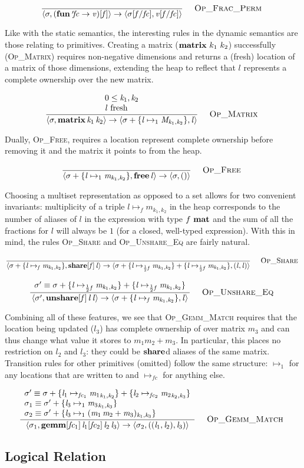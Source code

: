 \vspace{-\baselineskip}
\[
    \ottdruleOpXXFracXXPerm{}
\]

Like with the static semantics, the interesting rules in the dynamic semantics
are those relating to primitives. Creating a matrix ($\ottkw{matrix}\ k_1\
k_2$) successfully (\textsc{Op\_Matrix}) requires non-negative dimensions and
returns a (fresh) location of a matrix of those dimensions, extending the heap
to reflect that $l$ represents a complete ownership over the new matrix.

\vspace{-\baselineskip}
\[
    \ottdruleOpXXMatrix{}
\]

Dually, \textsc{Op\_Free}, requires a location represent complete ownership
before removing it and the matrix it points to from the heap.

\vspace{-\baselineskip}
\[
    \ottdruleOpXXFree{}
\]

Choosing a multiset representation as opposed to a set allows for two
convenient invariants: multiplicity of a triple $l \mapsto_f m_{k_1, k_2}$ in
the heap corresponds to the number of aliases of $l$ in the expression with
type $f\ \ottkw{mat}$ and the sum of all the fractions for $l$ will always be
$1$ (for a closed, well-typed expression). With this in mind, the rules
\textsc{Op\_Share} and \textsc{Op\_Unshare\_Eq} are fairly natural.

\vspace{-\baselineskip}
\[
    \ottdruleOpXXShare{} \\
\]

\vspace{-\baselineskip}
\[
    \ottdruleOpXXUnshareXXEq{}
\]

Combining all of these features, we see that \textsc{Op\_Gemm\_Match} requires
that the location being updated ($l_3$) has complete ownership of over matrix
$m_3$ and can thus change what value it stores to $m_1 m_2 + m_3$. In
particular, this places no restriction on $l_2$ and $l_3$: they could be
$\ottkw{share}$d aliases of the same matrix. Transition rules for other
primitives (omitted) follow the same structure: $\mapsto_1$ for any locations
that are written to and $\mapsto_{f\!c}$ for anything else.

\vspace{-\baselineskip}
\[
    \ottdruleOpXXGemmXXMatch{}
\]

\subsection{Logical Relation}


